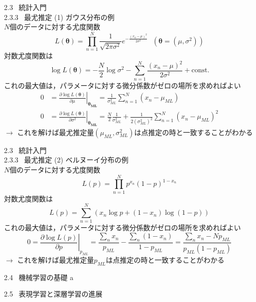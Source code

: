 \documentclass[dvipdfmx,10pt]{beamer}
\begin{document}
  \begin{frame}[t]{2.3 \ 統計入門 \\ \normalsize{2.3.3 \ 最尤推定}}
    (1) ガウス分布の例\\
    $N$個のデータに対する尤度関数
    \begin{equation*}
      L(\bm{\theta}) = \prod_{n=1}^{N}\frac{1}{\sqrt{2\pi\sigma^2}}e^{-\frac{(x_n - \mu)^2}{2\sigma^2}} \ \ \ (\bm{\theta}=(\mu,\sigma^2))
    \end{equation*}
    対数尤度関数は
    \begin{equation*}
      \log L(\bm{\theta}) = -\frac{N}{2}\log \sigma^2 -\sum_{n=1}^{N}\frac{(x_n-\mu)^2}{2\sigma^2}+\text{const.}
    \end{equation*}
    これの最大値は，パラメータに対する微分係数がゼロの場所を求めればよい
    \begin{align*}
      0 &= \left.\frac{\partial \log L(\bm{\theta})}{\partial \mu}\right|_{\bm{\theta_{ML}}} = \frac{1}{\sigma^2_{ML}}\sum_{n=1}^{N}(x_n - \mu_{ML})\\
      0 &= \left.\frac{\partial \log L(\bm{\theta})}{\partial \sigma^2}\right|_{\bm{\theta_{ML}}} = \frac{N}{2}\frac{1}{\sigma^2_{ML}} + \frac{1}{2(\sigma^2_{ML})^2}\sum_{n=1}^{N}(x_n - \mu_{ML})^2 
    \end{align*}
    $\rightarrow$ これを解けば最尤推定量$(\mu_{ML},\sigma^2_{ML})$は点推定の時と一致することがわかる
  \end{frame}

  \begin{frame}[t]{2.3 \ 統計入門 \\ \normalsize{2.3.3 \ 最尤推定}}
    (2) ベルヌーイ分布の例\\
    $N$個のデータに対する尤度関数
    \begin{equation*}
      L(p) = \prod_{n=1}^{N}p^{x_n}(1-p)^{1-x_n}
    \end{equation*}
    対数尤度関数は
    \begin{equation*}
      L(p) = \sum_{n=1}^{N}(x_n \log p+(1-x_n)\log (1-p))
    \end{equation*}
    これの最大値は，パラメータに対する微分係数がゼロの場所を求めればよい
    \begin{equation*}
      0 = \left.\frac{\partial \log L(p)}{\partial p}\right|_{p_{ML}} = \frac{\sum_n x_n}{p_{ML}}-\frac{\sum_n (1-x_n)}{1-p_{ML}} = \frac{\sum_n x_n - Np_{ML}}{p_{ML}(1-p_{ML})}
    \end{equation*}
    $\rightarrow$ これを解けば最尤推定量$p_{ML}$は点推定の時と一致することがわかる
  \end{frame}

  \begin{frame}{2.4 \ 機械学習の基礎}
    a

  \end{frame}

  \begin{frame}{2.5 \ 表現学習と深層学習の進展}
    
  \end{frame}
\end{document}
